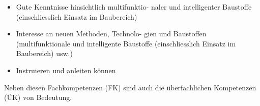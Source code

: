 \documentclass[
11pt,
captions=tableheading,
smallheadings,
headsepline,
footsepline, 
captions=tableheading,
parskip=half-,
]{scrartcl}
\begin{document}
\begin{itemize}
    \item Gute Kenntnisse hinsichtlich multifunktio-
          naler und intelligenter Baustoffe (einschliesslich Einsatz im Baubereich)
    \item Interesse an neuen Methoden, Technolo-
          gien und Baustoffen (multifunktionale und intelligente Baustoffe (einschliesslich Einsatz im Baubereich) usw.)
    \item Instruieren und anleiten können
\end{itemize}

Neben diesen Fachkompetenzen (FK) sind auch die überfachlichen Kompetenzen (ÜK) von Bedeutung.




\end{document}

